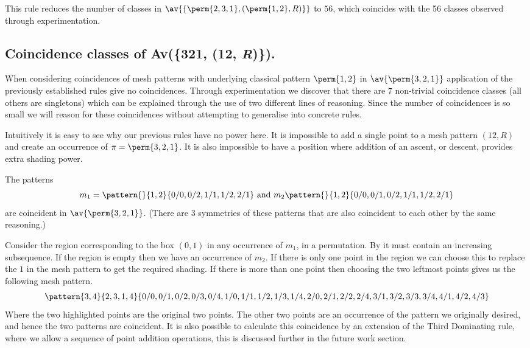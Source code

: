 This rule reduces the number of classes in
\(\av{\{\perm{2,3,1},(\perm{1,2}, R)\}}\) to \(56\), which coincides with the
56 classes observed through experimentation.

\subsection{Coincidence classes of Av(\{321, (12, \textit{R})\}).}
When considering coincidences of mesh patterns with underlying classical
pattern \(\perm{1,2}\) in \(\av{\perm{3,2,1}}\) application of the previously
established rules give no coincidences. Through experimentation we discover
that there are \(7\) non-trivial coincidence classes (all others are singletons)
which can be explained through the
use of two different lines of reasoning. Since the number of coincidences is
so small we will reason for these coincidences without attempting to generalise
into concrete rules.

Intuitively it is easy to see why our previous rules have no
power here. It is impossible to add a single point to a mesh pattern \((12, R)\) and
create an occurrence of \(\pi = \perm{3,2,1}\). It is also impossible to have
a position where addition of an ascent, or descent, provides extra
shading power.

The patterns
\begin{equation*}
    m_1 = \pattern{}{1,2}{0/0, 0/2, 1/1, 1/2, 2/1} \text { and } m_2 \pattern{}{1,2}{0/0, 0/1, 0/2, 1/1, 1/2, 2/1}
\end{equation*}
are coincident in \(\av{\perm{3,2,1}}\). (There are 3 symmetries of these
patterns that are also coincident to each other by the same reasoning.)

Consider the region corresponding to the box \((0,1)\) in any occurrence of \(m_1\),
in a permutation. By  it must contain an increasing subsequence.
If the region is empty then we have an occurrence of \(m_2\).
If there is only one point in the region we can choose this to replace the \(1\) in
the mesh pattern to get the required shading. If there is more than one point then
choosing the two leftmost points gives us the following mesh pattern.
\begin{equation*}
    \pattern{3,4}{2,3,1,4}{0/0, 0/1, 0/2, 0/3, 0/4,
                            1/0, 1/1, 1/2, 1/3, 1/4,
                            2/0, 2/1,2/2, 2/4,
                            3/1, 3/2, 3/3, 3/4,
                            4/1, 4/2, 4/3}
\end{equation*}
Where the two highlighted points are the original two points.
The other two points are an occurrence of the pattern
we originally desired, and hence the two patterns are coincident.
It is also possible to calculate this coincidence by an extension of the Third
Dominating rule, where we allow a sequence of point addition operations, this
is discussed further in the future work section.

